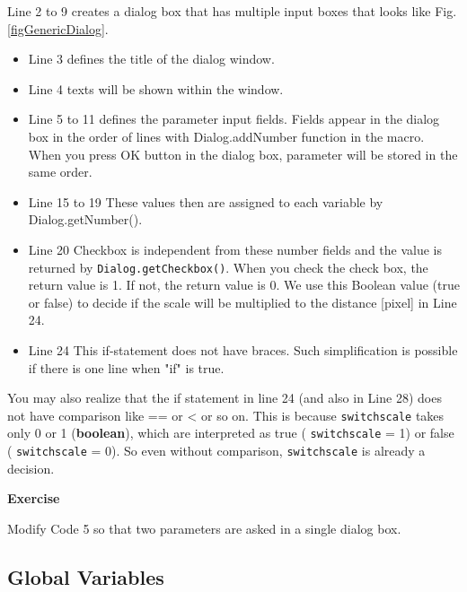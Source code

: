 \documentclass[11pt,a4paper,oneside]{report}
\newenvironment{indentexercise}[1]%
{{\setlength{\leftmargin}{2em}}%
\textbf{Exercise \thesubsection-#1}%
\begin{list}{}%
	\item%
}
{\end{list}}
\newcommand{\ilcom}[1]{\texttt{\small#1}}
\begin{document}
Line 2 to 9 creates a dialog box that has multiple input boxes that looks like Fig. \ref{figGenericDialog}. 

\begin{itemize}
\item Line 3 defines the title of the dialog window. 


\item Line 4 texts will be shown within the window. 

\item Line 5 to 11 defines the parameter input fields. Fields appear in the dialog box in the order of lines with Dialog.addNumber function in the macro. When you press OK button in the dialog box, parameter will be stored in the same order. 

\item Line 15 to 19 These values then are assigned to each variable by Dialog.getNumber(). 

\item Line 20 Checkbox is independent from these number fields and the value is returned by \ilcom{Dialog.getCheckbox()}. When you check the check box, the return value is 1. If not, the return value is 0. We use this Boolean value (true or false)  to decide if the scale will be multiplied to the distance [pixel] in Line 24.

\item Line 24 This if-statement does not have braces. Such simplification is possible if there is one line when "if" is true.  
\end{itemize}

You may also realize that the if statement in line 24 (and also in Line 28) does not have comparison like == or <  or so on. This is because \ilcom{switchscale} takes only 0 or 1 (\textbf{boolean}), which are interpreted as true ( \ilcom{switchscale} = 1) or false ( \ilcom{switchscale} = 0). So even without comparison, \ilcom{switchscale} is already a decision.  

\begin{indentexercise}{1}
Modify Code 5 so that two parameters are asked in a single dialog box. 
\end{indentexercise}

\subsection{Global Variables}
\end{document}
